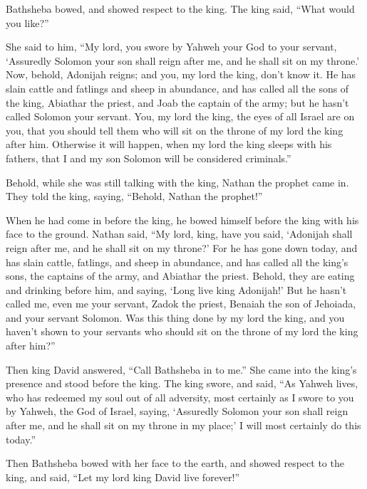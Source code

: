 {Bathsheba bowed, and showed respect to the king. The king said, “What would you like?”
\par }{\PP {}She said to him, “My lord, you swore by Yahweh your God to your servant, ‘Assuredly Solomon your son shall reign after me, and he shall sit on my throne.’
Now, behold, Adonijah reigns; and you, my lord the king, don’t know it.
He has slain cattle and fatlings and sheep in abundance, and has called all the sons of the king, Abiathar the priest, and Joab the captain of the army; but he hasn’t called Solomon your servant.
You, my lord the king, the eyes of all Israel are on you, that you should tell them who will sit on the throne of my lord the king after him.
Otherwise it will happen, when my lord the king sleeps with his fathers, that I and my son Solomon will be considered criminals.”
\par }{\PP {}Behold, while she was still talking with the king, Nathan the prophet came in.
They told the king, saying, “Behold, Nathan the prophet!”
\par }{\PP When he had come in before the king, he bowed himself before the king with his face to the ground.
Nathan said, “My lord, king, have you said, ‘Adonijah shall reign after me, and he shall sit on my throne?’
For he has gone down today, and has slain cattle, fatlings, and sheep in abundance, and has called all the king’s sons, the captains of the army, and Abiathar the priest. Behold, they are eating and drinking before him, and saying, ‘Long live king Adonijah!’
But he hasn’t called me, even me your servant, Zadok the priest, Benaiah the son of Jehoiada, and your servant Solomon.
Was this thing done by my lord the king, and you haven’t shown to your servants who should sit on the throne of my lord the king after him?”
\par }{\PP {}Then king David answered, “Call Bathsheba in to me.” She came into the king’s presence and stood before the king.
The king swore, and said, “As Yahweh lives, who has redeemed my soul out of all adversity,
most certainly as I swore to you by Yahweh, the God of Israel, saying, ‘Assuredly Solomon your son shall reign after me, and he shall sit on my throne in my place;’ I will most certainly do this today.”
\par }{\PP {}Then Bathsheba bowed with her face to the earth, and showed respect to the king, and said, “Let my lord king David live forever!”
}
